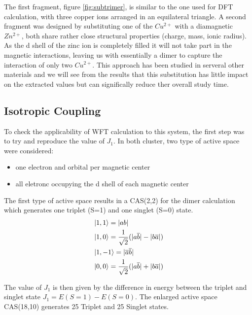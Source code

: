 \documentclass[10pt]{report}
\numberwithin{equation}{section}
\begin{document}
The first fragment, figure \ref{fig:subtrimer}, is similar to the one used for DFT calculation, with three copper ions arranged in an equilateral triangle. 
A second fragment was designed by substituting one of the $Cu^{2+}$ with a diamagnetic $Zn^{2+}$, both share rather close structural properties (charge, mass, ionic radius).
As the d shell of the zinc ion is completely filled it will not take part in the magnetic interactions, leaving us with essentially a dimer to capture the interaction of only two $Cu^{2+}$. 
This approach has been studied in serveral other materials and we will see from the results that this substitution has little impact on the extracted values but can significally reduce ther overall study time.

\subsection{Isotropic Coupling}

To check the applicability of WFT calculation to this system, the first step was to try and reproduce the value of $J_1$.
In both cluster, two type of active space were considered:
\begin{itemize}
    \item one electron and orbital per magnetic center
    \item all eletronc occupying the d shell of each magnetic center
\end{itemize}

The first type of active space results in a CAS(2,2) for the dimer calculation which generates one triplet (S=1) and one singlet (S=0) state.
\begin{align}
    &\ket{1,1}=|ab|\\
    &\ket{1,0}=\frac{1}{\sqrt{2}}(|a\overline{b}|-|b\overline{a}|)\\
    &\ket{1,-1}=|\overline{a}\overline{b}|\\
    &\ket{0,0}=\frac{1}{\sqrt{2}}(|a\overline{b}|+|b\overline{a}|)
\end{align}

The value of $J_1$ is then given by the difference in energy between the triplet and singlet state $J_1=E(S=1)-E(S=0)$.
The enlarged active space CAS(18,10) generates 25 Triplet and 25 Singlet states.
\end{document}
